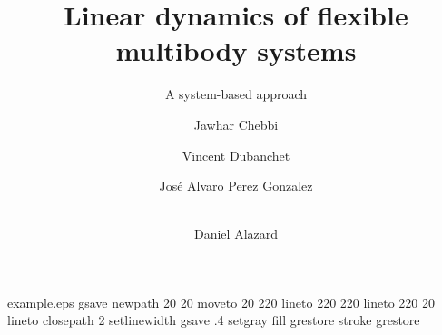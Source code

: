 %
%
%
%
%
\begin{filecontents*}{example.eps}
gsave
newpath
  20 20 moveto
  20 220 lineto
  220 220 lineto
  220 20 lineto
closepath
2 setlinewidth
gsave
  .4 setgray fill
grestore
stroke
grestore
\end{filecontents*}
%
\RequirePackage{fix-cm}
%
\documentclass[smallcondensed]{svjour3}     %
%
\smartqed  %
%
\usepackage{graphicx}
\usepackage[utf8]{inputenc}
\usepackage{placeins}
\newcommand{\matlab}{\textsc{Matlab }}
\newcommand{\simulink}{\textsc{Simulink }}
\newcommand{\nastran}{\textsc{Nastran }}
%
%
%
%
%


\title{Linear dynamics of flexible multibody systems%
}
\subtitle{A system-based approach}


\author{Jawhar Chebbi        \and
        Vincent Dubanchet    \and
        José Alvaro Perez Gonzalez \and \\
        Daniel Alazard
}

